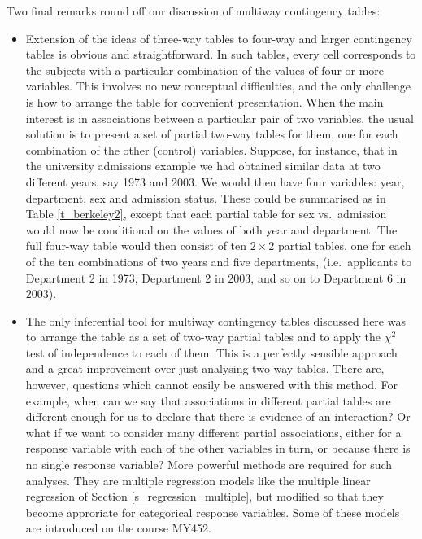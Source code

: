 Two final remarks round off our discussion of
multiway contingency tables:
\begin{itemize}
\item
Extension of the ideas of three-way tables to four-way and larger
contingency tables is obvious and straightforward. In such tables, every
cell corresponds to the subjects with a particular combination of the
values of four or more variables. This involves no new conceptual
difficulties, and the only challenge is how to arrange the table for
convenient presentation. When the main interest is in associations
between a particular pair of two variables, the usual solution is to
present a set of partial two-way tables for them, one for each
combination of the other (control) variables. Suppose, for instance,
that in the university admissions example we had obtained similar data
at two different years, say 1973 and 2003. We would then have four
variables: year, department, sex and admission status. These could be
summarised as in Table \ref{t_berkeley2}, except that each partial table
for sex vs.\ admission would now be conditional on the values of both
year and department.
The full four-way table
would then consist of ten $2\times 2$ partial tables, one for each of
the ten combinations of two years and five
departments, (i.e.\ applicants to Department 2 in 1973, Department 2 in
2003, and so on to Department 6 in 2003).
\item
The only inferential tool for multiway contingency tables discussed here
was to arrange the table as a set of two-way partial tables and to
apply the $\chi^{2}$ test of independence to each of them. This is a
perfectly sensible approach and a great improvement over just analysing
two-way tables. There are, however, questions which cannot easily be
answered with this method. For example, when can we say that
associations in different partial tables are different enough for us to
declare that there is evidence of an interaction? Or what if we want to
consider many different partial associations, either for a response
variable with each of the other variables in turn, or because there is
no single response variable? More powerful methods are
required for such analyses. They are multiple regression models like the
multiple linear regression of Section \ref{s_regression_multiple}, but
modified so that they become approriate for categorical response variables. Some of these
models are introduced on the course MY452.
\end{itemize}
